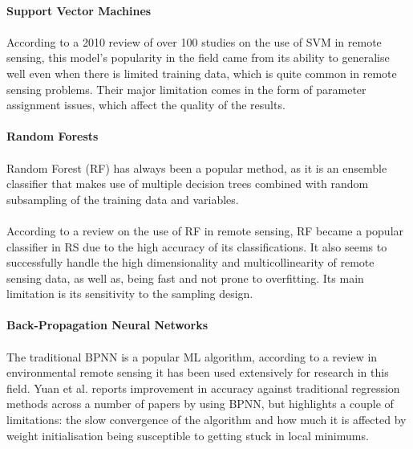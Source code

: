 \documentclass{article}
\begin{document}
\paragraph{Support Vector Machines}
\paragraph{}
According to a 2010 review \cite{MOUNTRAKIS2011247} of over 100 studies on the use of SVM in remote sensing, this model's popularity in the field came from its ability to generalise well even when there is limited training data, which is quite common in remote sensing problems. Their major limitation comes in the form of parameter assignment issues, which affect the quality of the results.

\paragraph{Random Forests}
\paragraph{}
Random Forest (RF) has always been a popular method, as it is an ensemble classifier that makes use of multiple decision trees combined with random subsampling of the training data and variables. 
\paragraph{}
According to a review on the use of RF in remote sensing, \cite{BELGIU201624} RF became a popular classifier in RS due to the high accuracy of its classifications. It also seems to successfully handle the high dimensionality and multicollinearity of remote sensing data, as well as, being fast and not prone to overfitting. Its main limitation is its sensitivity to the sampling design.

\paragraph{Back-Propagation Neural Networks}
\paragraph{}
The traditional BPNN is a popular ML algorithm, according to a review \cite{YUAN2020111716} in environmental remote sensing it has been used extensively for research in this field. Yuan et al. reports improvement in accuracy against traditional regression methods across a number of papers by using BPNN, but highlights a couple of limitations: the slow convergence of the algorithm and how much it is affected by weight initialisation being susceptible to getting stuck in local minimums. 
\end{document}

